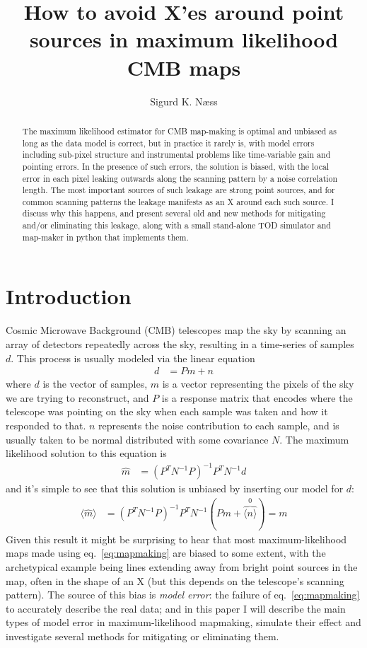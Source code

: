 \documentclass{article}
\title{How to avoid X'es around point sources in maximum likelihood CMB maps}
\author[1]{Sigurd K. Næss}
\affil[1]{Center for Computational Astrophysics, Flatiron Institute}
\begin{document}
\maketitle
\begin{abstract}
	The maximum likelihood estimator for CMB map-making is optimal and unbiased as long as
	the data model is correct, but in practice it rarely is, with model errors including
	sub-pixel structure and instrumental problems like time-variable gain and pointing errors.
	In the presence of such errors, the solution is biased, with the local error in each pixel
	leaking outwards along the scanning pattern by a noise correlation length. The most important
	sources of such leakage are strong point sources, and for common scanning patterns the leakage
	manifests as an X around each such source. I discuss why this happens, and present several
	old and new methods for mitigating and/or eliminating this leakage, along with a small
	stand-alone TOD simulator and map-maker in python that implements them.
\end{abstract}

\section{Introduction}
Cosmic Microwave Background (CMB) telescopes map the sky by scanning an array of detectors repeatedly across
the sky, resulting in a time-series of samples $d$. This process is usually
modeled via the linear equation \citep{tegmark/map/1997}
\begin{align}
d &= Pm + n \label{eq:model}
\end{align}
where $d$ is the vector of samples,
$m$ is a vector representing the pixels of the sky we are trying to reconstruct, and
$P$ is a response matrix that encodes where the telescope was pointing on the sky
when each sample was taken and how it responded to that. $n$ represents the
noise contribution to each sample, and is usually taken to be normal distributed
with some covariance $N$. The maximum likelihood solution to this equation is
\begin{align}
\hat m &= (P^T N^{-1} P)^{-1} P^T N^{-1} d \label{eq:mapmaking}
\end{align}
and it's simple to see that this solution is unbiased by inserting our model for $d$:
\begin{align}
\langle \hat m \rangle &= (P^T N^{-1} P)^{-1}P^T N^{-1}(Pm + \overbrace{\langle n \rangle}^{0}) = m
\end{align}
Given this result it might be surprising to hear that most maximum-likelihood maps
made using eq.~\ref{eq:mapmaking} are biased to some extent, with the archetypical example
being lines extending away from bright point sources in the map, often in the shape of an X
(but this depends on the telescope's scanning pattern). The source of this bias is \emph{model
error}: the failure of eq.~\ref{eq:mapmaking} to accurately describe the real data; and
in this paper I will describe the main types of model error in maximum-likelihood mapmaking, simulate their
effect and investigate several methods for mitigating or eliminating them.
\end{document}
